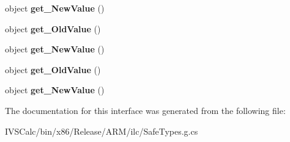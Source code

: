 \begin{DoxyCompactItemize}
\mbox{\label{interface_windows_1_1_u_i_1_1_xaml_1_1_i_dependency_property_changed_event_args_a44a0890418189c0d52d6eb9b9a86d355}} 
object {\bfseries get\+\_\+\+New\+Value} ()
\item 
\mbox{\label{interface_windows_1_1_u_i_1_1_xaml_1_1_i_dependency_property_changed_event_args_a8140c2b70727e626b0bd04fa5ddf12d7}} 
object {\bfseries get\+\_\+\+Old\+Value} ()
\item 
\mbox{\label{interface_windows_1_1_u_i_1_1_xaml_1_1_i_dependency_property_changed_event_args_a44a0890418189c0d52d6eb9b9a86d355}} 
object {\bfseries get\+\_\+\+New\+Value} ()
\item 
\mbox{\label{interface_windows_1_1_u_i_1_1_xaml_1_1_i_dependency_property_changed_event_args_a8140c2b70727e626b0bd04fa5ddf12d7}} 
object {\bfseries get\+\_\+\+Old\+Value} ()
\item 
\mbox{\label{interface_windows_1_1_u_i_1_1_xaml_1_1_i_dependency_property_changed_event_args_a44a0890418189c0d52d6eb9b9a86d355}} 
object {\bfseries get\+\_\+\+New\+Value} ()
\end{DoxyCompactItemize}


The documentation for this interface was generated from the following file\+:\begin{DoxyCompactItemize}
\item 
I\+V\+S\+Calc/bin/x86/\+Release/\+A\+R\+M/ilc/Safe\+Types.\+g.\+cs\end{DoxyCompactItemize}

